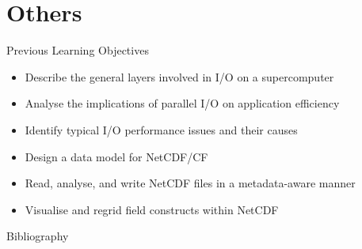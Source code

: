 \documentclass[compress,11pt,xcolor=svgnames,aspectratio=169]{beamer}
\begin{document}
\section{Others}

\begin{frame}[t]{Previous Learning Objectives}

\begin{itemize}

    \item Describe the general layers involved in I/O on a supercomputer
    \item Analyse the implications of parallel I/O on application efficiency
    \item Identify typical I/O performance issues and their causes
    \item Design a data model for NetCDF/CF
    \item Read, analyse, and write NetCDF files in a metadata-aware manner
    \item Visualise and regrid field constructs within NetCDF

\end{itemize}

\end{frame}

\begin{frame}[allowframebreaks]{Bibliography}




\end{frame}

\acknowledgement
\end{document}
